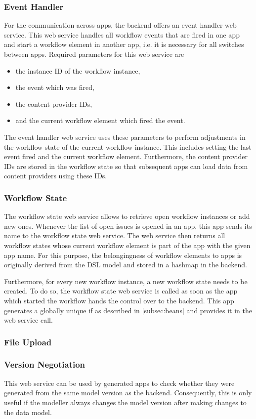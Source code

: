 \subsubsection{Event Handler} 

For the communication across apps, the backend offers an event handler web service. This web service handles all workflow events that are fired in one app and start a workflow element in another app, i.e. it is necessary for all switches between apps. Required parameters for this web service are

\begin{itemize}
\item the instance ID of the workflow instance,
\item the event which was fired,
\item the content provider IDs,
\item and the current workflow element which fired the event.
\end{itemize}

The event handler web service uses these parameters to perform adjustments in the workflow state of the current workflow instance. This includes setting the last event fired and the current workflow element. Furthermore, the content provider IDs are stored in the workflow state so that subsequent apps can load data from content providers using these IDs.

\subsubsection{Workflow State} 

The workflow state web service allows to retrieve open workflow instances or add new ones. Whenever the list of open issues is opened in an app, this app sends its name to the workflow state web service. The web service then returns all workflow states whose current workflow element is part of the app with the given app name. For this purpose, the belongingness of workflow elements to apps is originally derived from the DSL model and stored in a hashmap in the backend.

Furthermore, for every new workflow instance, a new workflow state needs to be created. To do so, the workflow state web service is called as soon as the app which started the workflow hands the control over to the backend. This app generates a globally unique if as described in \ref{subsec:beans} and provides it in the web service call.

\subsubsection{File Upload} 

\subsubsection{Version Negotiation} 
This web service can be used by generated apps to check whether they were generated from the same model version as the backend. Consequently, this is only useful if the modeller always changes the model version after making changes to the data model.

